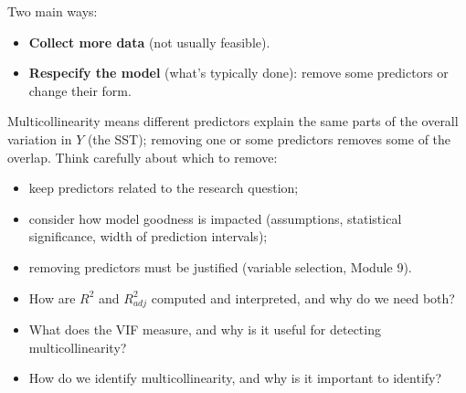 \begin{remark}
    Two main ways:
    \begin{itemize}
        \item \textbf{Collect more data} (not usually feasible).
        \item \textbf{Respecify the model} (what's typically done): remove some predictors or
        change their form.
    \end{itemize}
    Multicollinearity means different predictors explain the same parts of the overall variation
    in $Y$ (the SST); removing one or some predictors removes some of the overlap. Think carefully
    about which to remove:
    \begin{itemize}
        \item keep predictors related to the research question;
        \item consider how model goodness is impacted (assumptions, statistical significance,
        width of prediction intervals);
        \item removing predictors must be justified (variable selection, Module 9).
    \end{itemize}
\end{remark}

\begin{remark}
    \begin{itemize}
        \item How are $R^2$ and $R^2_{adj}$ computed and interpreted, and why do we need both?
        \item What does the VIF measure, and why is it useful for detecting multicollinearity?
        \item How do we identify multicollinearity, and why is it important to identify?
    \end{itemize}
\end{remark}
